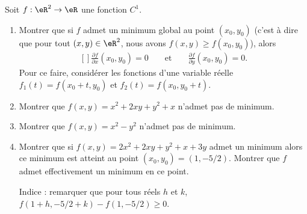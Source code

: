 \begin{exercice}\label{exoCalculDifferentiel0005}

Soit $f:\eR^2\to\eR$ une fonction $C^1$. 
\begin{enumerate}
	\item
Montrer que si $f$ admet un minimum global au point $(x_0,y_0)$ (c'est à dire que pour tout  $(x,y)\in\eR^2$, nous avons $f(x,y)\geq f(x_0,y_0)$), alors
\begin{equation}
	\begin{aligned}[]
		\frac{\partial f}{\partial x}(x_0,y_0) =0 &&\text{ et } &&  \frac{\partial f}{\partial y}(x_0,y_0) =0.
	\end{aligned}
\end{equation}
Pour ce faire, considérer les fonctions d'une variable réelle $f_1(t) = f(x_0+t,y_0)$ et $f_2(t)  =f(x_0,y_0+t)$.
\item
 Montrer que $f(x,y) = x^2 + 2xy + y^2 +x$ n'admet pas de minimum.
\item
 Montrer que $f(x,y) = x^2 - y^2$ n'admet pas de minimum.
\item
 Montrer que si $f(x,y) = 2x^2 + 2xy + y^2 +x + 3y$ admet un minimum alors ce minimum est atteint au point $(x_0,y_0) = (1, -5/2)$. Montrer que $f$ admet effectivement un minimum en ce point. 

 Indice : remarquer que pour tous réels $h$ et $k$, $f(1+h,-5/2+k) -  f(1,-5/2) \geq 0$.
\end{enumerate}


\end{exercice}
